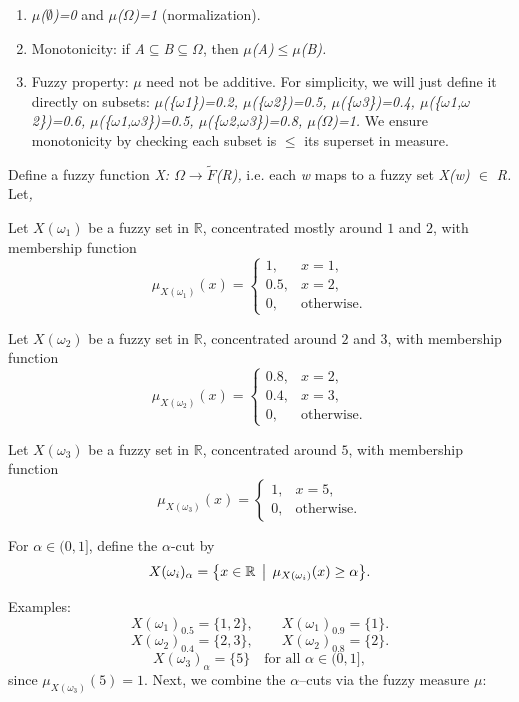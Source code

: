 \documentclass[12pt,a4paper]{report}
\numberwithin{equation}{section}
\begin{document}
\begin{enumerate}
\def\labelenumi{\roman{enumi}.}
\item
  \emph{$\mu$($\emptyset$)=0} and \emph{$\mu$($\Omega$)=1} (normalization).
\item
  Monotonicity: if \emph{A$\subseteq$B$\subseteq$$\Omega$}, then \emph{$\mu$(A)$\leq$$\mu$(B).}
\item
  Fuzzy property: \emph{$\mu$} need not be additive. For simplicity, we will
  just define it directly on subsets: \emph{$\mu$(\{$\omega$1\})=0.2,
  $\mu$(\{$\omega$2\})=0.5, $\mu$(\{$\omega$3\})=0.4, $\mu$(\{$\omega$1,$\omega$2\})=0.6,}
  \emph{$\mu$(\{$\omega$1,$\omega$3\})=0.5, $\mu$(\{$\omega$2,$\omega$3\})=0.8, $\mu$($\Omega$)=1.} We ensure
  monotonicity by checking each subset is $\leq$ its superset in measure.
\end{enumerate}

Define a fuzzy function \emph{X: $\Omega$$\rightarrow$}\(\widetilde{F}\)\emph{(R),}
i.e\emph{.} each \emph{w} maps to a fuzzy set \emph{X(w) $\in$ R.}
Let\emph{,}

\noindent Let \(X(\omega_{1})\) be a fuzzy set in \(\mathbb{R}\), concentrated mostly around \(1\) and \(2\), with membership function
\[
\mu_{X(\omega_{1})}(x)=
\begin{cases}
1,   & x=1,\\
0.5, & x=2,\\
0,   & \text{otherwise}.
\end{cases}
\]

\noindent Let \(X(\omega_{2})\) be a fuzzy set in \(\mathbb{R}\), concentrated around \(2\) and \(3\), with membership function
\[
\mu_{X(\omega_{2})}(x)=
\begin{cases}
0.8, & x=2,\\
0.4, & x=3,\\
0,   & \text{otherwise}.
\end{cases}
\]

\noindent Let \(X(\omega_{3})\) be a fuzzy set in \(\mathbb{R}\), concentrated around \(5\), with membership function
\[
\mu_{X(\omega_{3})}(x)=
\begin{cases}
1, & x=5,\\
0, & \text{otherwise}.
\end{cases}
\]

\noindent For \(\alpha\in(0,1]\), define the \(\alpha\)-cut by
\[
X(\omega_i)_{\alpha}=\bigl\{x\in\mathbb{R}\,\bigm|\,\mu_{X(\omega_i)}(x)\ge \alpha\bigr\}.
\]

\noindent Examples:
\[
X(\omega_{1})_{0.5}=\{1,2\},\qquad
X(\omega_{1})_{0.9}=\{1\}.
\]
\[
X(\omega_{2})_{0.4}=\{2,3\},\qquad
X(\omega_{2})_{0.8}=\{2\}.
\]
\[
X(\omega_{3})_{\alpha}=\{5\}\quad \text{for all }\alpha\in(0,1],
\]
since \(\mu_{X(\omega_{3})}(5)=1\).
Next, we combine the $\alpha$--cuts via the fuzzy measure $\mu$:
\end{document}
